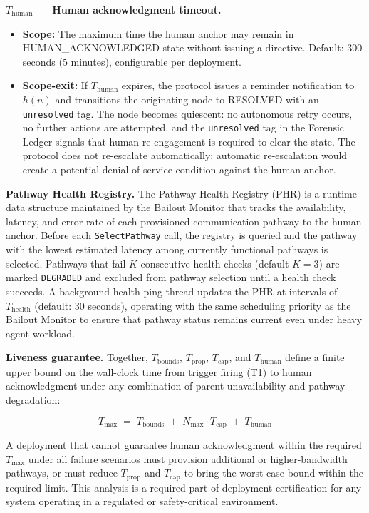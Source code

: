 \bigskip
\noindent\textbf{$T_{\text{human}}$ --- Human acknowledgment timeout.}

\begin{itemize}
    \item \textbf{Scope:} The maximum time the human anchor may remain in HUMAN\_ACKNOWLEDGED state without issuing a directive. Default: 300 seconds (5 minutes), configurable per deployment.
    \item \textbf{Scope-exit:} If $T_{\text{human}}$ expires, the protocol issues a reminder notification to $h(n)$ and transitions the originating node to RESOLVED with an \texttt{unresolved} tag. The node becomes quiescent: no autonomous retry occurs, no further actions are attempted, and the \texttt{unresolved} tag in the Forensic Ledger signals that human re-engagement is required to clear the state. The protocol does not re-escalate automatically; automatic re-escalation would create a potential denial-of-service condition against the human anchor.
\end{itemize}

\bigskip
\noindent\textbf{Pathway Health Registry.} The Pathway Health Registry (PHR) is a runtime data structure maintained by the Bailout Monitor that tracks the availability, latency, and error rate of each provisioned communication pathway to the human anchor. Before each \texttt{SelectPathway} call, the registry is queried and the pathway with the lowest estimated latency among currently functional pathways is selected. Pathways that fail $K$ consecutive health checks (default $K = 3$) are marked \texttt{DEGRADED} and excluded from pathway selection until a health check succeeds. A background health-ping thread updates the PHR at intervals of $T_{\text{health}}$ (default: 30 seconds), operating with the same scheduling priority as the Bailout Monitor to ensure that pathway status remains current even under heavy agent workload.

\bigskip
\noindent\textbf{Liveness guarantee.} Together, $T_{\text{bounds}}$, $T_{\text{prop}}$, $T_{\text{cap}}$, and $T_{\text{human}}$ define a finite upper bound on the wall-clock time from trigger firing (T1) to human acknowledgment under any combination of parent unavailability and pathway degradation:

\begin{equation}
T_{\max} \;=\; T_{\text{bounds}} \;+\; N_{\max} \cdot T_{\text{cap}} \;+\; T_{\text{human}} \tag{T-max}
\end{equation}

A deployment that cannot guarantee human acknowledgment within the required $T_{\max}$ under all failure scenarios must provision additional or higher-bandwidth pathways, or must reduce $T_{\text{prop}}$ and $T_{\text{cap}}$ to bring the worst-case bound within the required limit. This analysis is a required part of deployment certification for any \bxthree{} system operating in a regulated or safety-critical environment.

